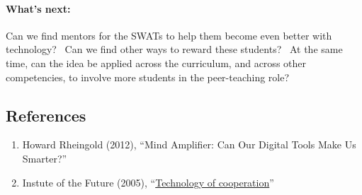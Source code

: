 \paragraph{What's next:}\label{whats-next}

Can we find mentors for the SWATs to help them become even better with
technology? ~Can we find other ways to reward these students? ~At the
same time, can the idea be applied across the curriculum, and across
other competencies, to involve more students in the peer-teaching role?

\subsection{References}\label{swats-references}

\begin{enumerate}
\def\labelenumi{\arabic{enumi}.}
\item
  Howard Rheingold (2012), ``Mind Amplifier: Can Our Digital Tools Make
  Us Smarter?''
\item
  Instute of the Future (2005),
  ``\href{http://www.rheingold.com/cooperation/Technology_of_cooperation.pdf}{Technology
  of cooperation}''
\end{enumerate}
